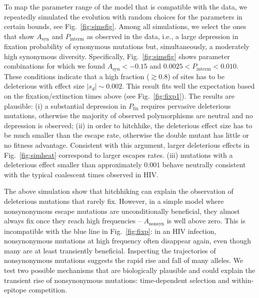 \documentclass[rmp, twocolumn]{revtex4}
\newcommand{\pfix}{P_{\mathrm{fix}}}
\newcommand{\FIG}[1]{Fig.~\ref{fig:#1}}
\begin{document}
To map the parameter range of the model that is compatible with the data, we
repeatedly simulated the evolution with random choices for the parameters in
certain bounds, see \FIG{simsfig}. Among all simulations, we select the ones
that show $A_\text{syn}$ and $P_\text{interm}$ as observed in the data, i.e., a
large depression in fixation probability of synonymous mutations but,
simultaneously, a moderately high synonymous diversity. Specifically,
\FIG{simsfig} shows parameter combinations for which we found $A_\text{syn} <
-0.15$ and $0.0025 < P_\text{interm} < 0.010$. These conditions indicate that a
high fraction ($\gtrsim 0.8$) of sites has to be deleterious with effect size
$|s_d| \sim 0.002$.  This result fits well the expectation based on the
fixation/extinction times above (see \FIG{fixp1}). The results are plausible:
(i) a substantial depression in $\pfix$ requires pervasive deleterious
mutations, otherwise the majority of observed polymorphisms are neutral and no
depression is observed; (ii) in order to hitchhike, the deleterious effect size
has to be much smaller than the escape rate, otherwise the double mutant has
little or no fitness advantage. Consistent with this argument, larger
deleterious effects in \FIG{simheat} correspond to larger escapes rates. (iii)
mutations with a deleterious effect smaller than approximately $0.001$ behave
neutrally consistent with the typical coalescent times observed in HIV.

The above simulation show that hitchhiking can explain the observation of
deleterious mutations that rarely fix. However, in a simple model where
nonsynonymous escape mutations are unconditionally beneficial, they almost
always fix once they reach high frequencies -- $A_{\mathrm{nonsyn}}$ is well
above zero. This is incompatible with the blue line in \FIG{fixp}: in an HIV
infection, nonsynonymous mutations at high frequency often disappear again, even
though many are at least transiently beneficial. Inspecting the trajectories of
nonsynonymous mutations suggests the rapid rise and fall of many alleles. We
test two possible mechanisms that are biologically plausible and could explain
the transient rise of nonsynonymous mutations: time-dependent selection and
within-epitope competition.
\end{document}
